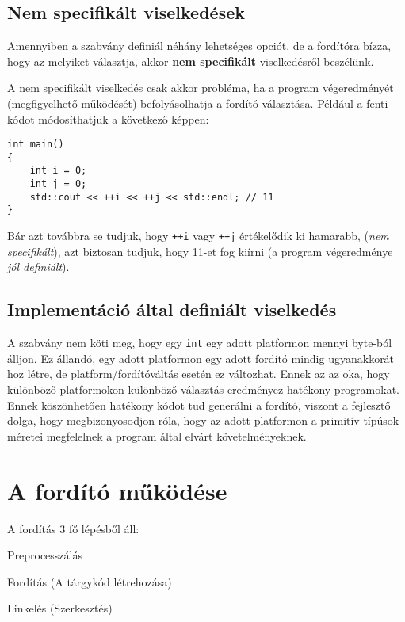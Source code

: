\documentclass[a4paper,11.5pt,table]{article}
\begin{document}
	\subsection{Nem specifikált viselkedések}
	Amennyiben a szabvány definiál néhány lehetséges opciót, de a fordítóra bízza, hogy az melyiket választja, akkor \textbf{nem specifikált} viselkedésről beszélünk.
	
  A nem specifikált viselkedés csak akkor probléma, ha a program végeredményét (megfigyelhető működését) befolyásolhatja a fordító választása. Például a fenti kódot módosíthatjuk a következő képpen:

	\begin{lstlisting}
int main()
{
	int i = 0;
	int j = 0;
	std::cout << ++i << ++j << std::endl; // 11
}
	\end{lstlisting}
	Bár azt továbbra se tudjuk, hogy \texttt{++i} vagy \texttt{++j} értékelődik ki hamarabb, (\textit{nem specifikált}), azt biztosan tudjuk, hogy 11-et fog kiírni (a program végeredménye \textit{jól definiált}).

	\subsection{Implementáció által definiált viselkedés}
	A szabvány nem köti meg, hogy egy \texttt{int} egy adott platformon mennyi byte-ból álljon. Ez állandó, egy adott platformon egy adott fordító mindig ugyanakkorát hoz létre, de platform/fordítóváltás esetén ez változhat. Ennek az az oka, hogy különböző platformokon különböző választás eredményez hatékony programokat. Ennek köszönhetően hatékony kódot tud generálni a fordító, viszont a fejlesztő dolga, hogy megbizonyosodjon róla, hogy az adott platformon a primitív típúsok méretei megfelelnek a program által elvárt követelményeknek.
	
	\section{A fordító működése}
	A fordítás 3 fő lépésből áll:
	\begin{compactenum}
		\item Preprocesszálás
		\item Fordítás (A tárgykód létrehozása)
		\item Linkelés (Szerkesztés)
	\end{compactenum}
	
\end{document}
